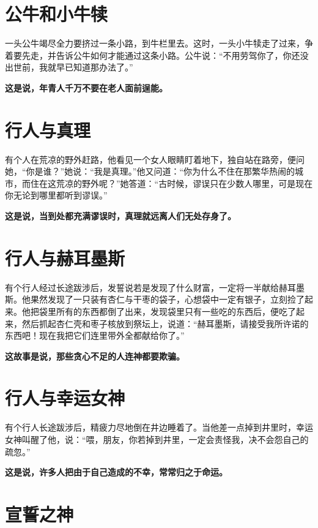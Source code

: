{\bfseries \color{red}}

\section{公牛和小牛犊}

一头公牛竭尽全力要挤过一条小路，到牛栏里去。这时，一头小牛犊走了过来，争着要先走，并告诉公牛如何才能通过这条小路。公牛说：“不用劳驾你了，你还没出世前，我就早已知道那办法了。”

{\bfseries \color{red}这是说，年青人千万不要在老人面前逞能。}

\section{行人与真理}

有个人在荒凉的野外赶路，他看见一个女人眼睛盯着地下，独自站在路旁，便问她，“你是谁？”她说：“我是真理。”他又问道：“你为什么不住在那繁华热闹的城市，而住在这荒凉的野外呢？”她答道：“古时候，谬误只在少数人哪里，可是现在你无论到哪里都听到谬误。”

{\bfseries \color{red}这是说，当到处都充满谬误时，真理就远离人们无处存身了。}

\section{行人与赫耳墨斯}

有个行人经过长途跋涉后，发誓说若是发现了什么财富，一定将一半献给赫耳墨斯。他果然发现了一只装有杏仁与干枣的袋子，心想袋中一定有银子，立刻捡了起来。他把袋里所有的东西都倒了出来，发现袋里只有一些吃的东西后，便吃了起来，然后抓起杏仁壳和枣子核放到祭坛上，说道：“赫耳墨斯，请接受我所许诺的东西吧！现在我把它们连里带外全都献给你了。”

{\bfseries \color{red}这故事是说，那些贪心不足的人连神都要欺骗。}

\section{行人与幸运女神}

有个行人长途跋涉后，精疲力尽地倒在井边睡着了。当他差一点掉到井里时，幸运女神叫醒了他，说：“喂，朋友，你若掉到井里，一定会责怪我，决不会怨自己的疏忽。”

{\bfseries \color{red}这是说，许多人把由于自己造成的不幸，常常归之于命运。}

\section{宣誓之神}

